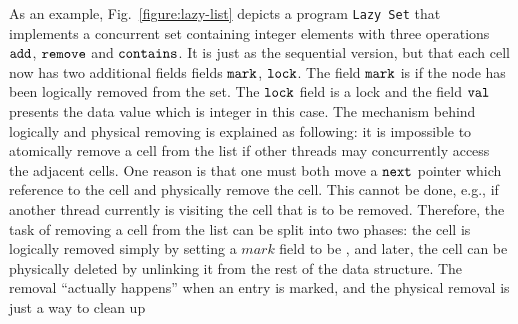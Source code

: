 As an example, Fig.~\ref{figure:lazy-list} depicts a program
{\tt Lazy Set} \cite{Lazyset}
that implements a concurrent set containing integer
elements with three operations $\tt add$, $\tt remove$ and $\tt contains$.
It is just as the sequential version,
but that each cell now has two additional fields fields ${\tt mark}$, ${\tt lock}$. The field $\tt mark$ is \true\; if
the node has been logically removed from the set. The ${\tt lock}$ field is a lock and the field ${\tt val}$ presents the data value which is integer in this case. The
mechanism behind logically and physical removing is explained as following: it is impossible to atomically remove a cell from the list if other threads may concurrently access the adjacent cells. One reason is that one must both move a $\tt next$ pointer which reference to the cell and physically remove the cell. This cannot be done, e.g., if another thread currently is visiting the cell that is to be removed. Therefore, the task of removing a cell from the list  can be split into two phases: the cell is logically removed simply by setting a $mark$ field to be \true, and later, the cell can be physically deleted by unlinking it from the rest of the data structure. The removal “actually happens” when an entry is marked, and the physical removal is just a way to clean up
